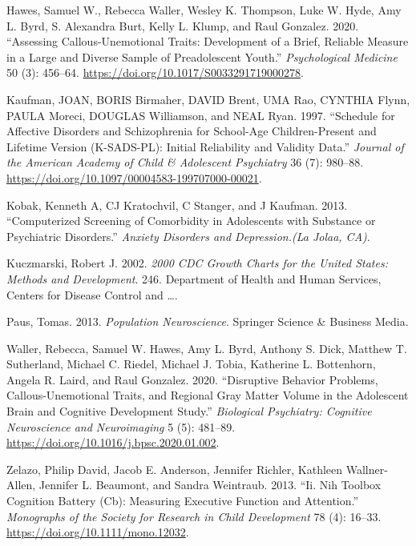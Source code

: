 \documentclass{article}
\newlength{\cslhangindent}
\newlength{\cslentryspacingunit} %
\newenvironment{CSLReferences}[2] %
 {%
  \setlength{\parindent}{0pt}
  \ifodd #1
  \let\oldpar\par
  \def\par{\hangindent=\cslhangindent\oldpar}
  \fi
  \setlength{\parskip}{#2\cslentryspacingunit}
 }%
 {}
\begin{document}
\begin{CSLReferences}{1}{0}
\leavevmode{}%
Hawes, Samuel W., Rebecca Waller, Wesley K. Thompson, Luke W. Hyde, Amy
L. Byrd, S. Alexandra Burt, Kelly L. Klump, and Raul Gonzalez. 2020.
{``Assessing Callous-Unemotional Traits: Development of a Brief,
Reliable Measure in a Large and Diverse Sample of Preadolescent
Youth.''} \emph{Psychological Medicine} 50 (3): 456--64.
\url{https://doi.org/10.1017/S0033291719000278}.

\leavevmode{}%
Kaufman, JOAN, BORIS Birmaher, DAVID Brent, UMA Rao, CYNTHIA Flynn,
PAULA Moreci, DOUGLAS Williamson, and NEAL Ryan. 1997. {``Schedule for
{Affective Disorders} and {Schizophrenia} for {School-Age
Children-Present} and {Lifetime Version} ({K-SADS-PL}): {Initial
Reliability} and {Validity Data}.''} \emph{Journal of the American
Academy of Child \& Adolescent Psychiatry} 36 (7): 980--88.
\url{https://doi.org/10.1097/00004583-199707000-00021}.

\leavevmode{}%
Kobak, Kenneth A, CJ Kratochvil, C Stanger, and J Kaufman. 2013.
{``Computerized Screening of Comorbidity in Adolescents with Substance
or Psychiatric Disorders.''} \emph{Anxiety Disorders and Depression.(La
Jolaa, CA)}.

\leavevmode{}%
Kuczmarski, Robert J. 2002. \emph{2000 {CDC Growth Charts} for the
{United States}: Methods and Development}. 246. {Department of Health
and Human Services, Centers for Disease Control and \ldots{}}.

\leavevmode{}%
Paus, Tomas. 2013. \emph{Population {Neuroscience}}. {Springer Science
\& Business Media}.

\leavevmode{}%
Waller, Rebecca, Samuel W. Hawes, Amy L. Byrd, Anthony S. Dick, Matthew
T. Sutherland, Michael C. Riedel, Michael J. Tobia, Katherine L.
Bottenhorn, Angela R. Laird, and Raul Gonzalez. 2020. {``Disruptive
{Behavior Problems}, {Callous-Unemotional Traits}, and {Regional Gray
Matter Volume} in the {Adolescent Brain} and {Cognitive Development
Study}.''} \emph{Biological Psychiatry: Cognitive Neuroscience and
Neuroimaging} 5 (5): 481--89.
\url{https://doi.org/10.1016/j.bpsc.2020.01.002}.

\leavevmode{}%
Zelazo, Philip David, Jacob E. Anderson, Jennifer Richler, Kathleen
Wallner-Allen, Jennifer L. Beaumont, and Sandra Weintraub. 2013. {``Ii.
{Nih Toolbox Cognition Battery} (Cb): {Measuring Executive Function} and
{Attention}.''} \emph{Monographs of the Society for Research in Child
Development} 78 (4): 16--33. \url{https://doi.org/10.1111/mono.12032}.

\end{CSLReferences}



\end{document}
